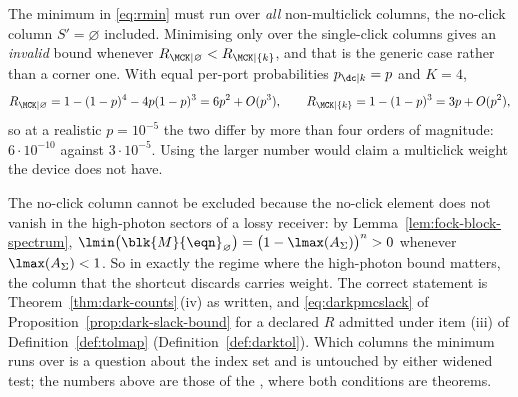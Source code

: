 
\begin{remark}\label{rem:rmintrap}
The minimum in \eqref{eq:rmin} must run over \emph{all} non-multiclick columns,
the no-click column $S'=\varnothing$ included. Minimising only over the
single-click columns gives an \emph{invalid} bound whenever
$R_{\MCK|\varnothing}<R_{\MCK|\{k\}}$, and that is the generic case rather than
a corner one. With equal per-port probabilities $p_{\dc|k}=p$ and $K=4$,
\begin{equation}\label{eq:rmintrapnum}
  R_{\MCK|\varnothing}=1-(1-p)^4-4p(1-p)^3=6p^2+O(p^3),
  \qquad
  R_{\MCK|\{k\}}=1-(1-p)^3=3p+O(p^2),
\end{equation}
so at a realistic $p=10^{-5}$ the two differ by more than four orders of
magnitude: $6\cdot10^{-10}$ against $3\cdot10^{-5}$. Using the larger number
would claim a multiclick weight the device does not have.

The no-click column cannot be excluded because the no-click element does not
vanish in the high-photon sectors of a lossy receiver: by
Lemma~\ref{lem:fock-block-spectrum},
$\lmin\big(\blk{M}{\eqn}_{\varnothing}\big)
=\big(1-\lmax(A_\Sigma)\big)^{n}>0$ whenever $\lmax(A_\Sigma)<1$. So
in exactly the regime where the high-photon bound matters, the column that the
shortcut discards carries weight. The correct statement is
Theorem~\ref{thm:dark-counts}\,(iv) as written, and \eqref{eq:darkpmcslack} of
Proposition~\ref{prop:dark-slack-bound} for a declared $R$ admitted under
item (iii) of Definition~\ref{def:tolmap} (Definition~\ref{def:darktol}).
Which columns the minimum runs over is a question about the index set and is
untouched by either widened test; the numbers above are those of the
, where both conditions are theorems.
\end{remark}
